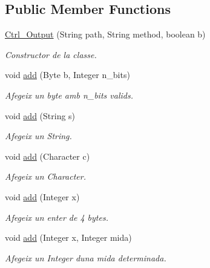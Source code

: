 \subsection*{Public Member Functions}
\begin{DoxyCompactItemize}
\item 
\hyperlink{classpersistencia_1_1output_1_1Ctrl__Output_afeb28ec6172b522bf6bdaf16238d622b}{Ctrl\+\_\+\+Output} (String path, String method, boolean b)
\begin{DoxyCompactList}\small\item\em Constructor de la classe. \end{DoxyCompactList}\item 
void \hyperlink{classpersistencia_1_1output_1_1Ctrl__Output_a8c5aa5a6acb5259faeb1c05c71ddd21c}{add} (Byte b, Integer n\+\_\+bits)
\begin{DoxyCompactList}\small\item\em Afegeix un byte amb n\+\_\+bits valids. \end{DoxyCompactList}\item 
void \hyperlink{classpersistencia_1_1output_1_1Ctrl__Output_a0e3bedb0b88d0e60b228cc49143e6f0e}{add} (String s)
\begin{DoxyCompactList}\small\item\em Afegeix un String. \end{DoxyCompactList}\item 
void \hyperlink{classpersistencia_1_1output_1_1Ctrl__Output_a4070b40016edf1d959b3f7c60c90ef10}{add} (Character c)
\begin{DoxyCompactList}\small\item\em Afegeix un Character. \end{DoxyCompactList}\item 
void \hyperlink{classpersistencia_1_1output_1_1Ctrl__Output_aefe249b0ae9dbe578c44d96c6b56cf5d}{add} (Integer x)
\begin{DoxyCompactList}\small\item\em Afegeix un enter de 4 bytes. \end{DoxyCompactList}\item 
void \hyperlink{classpersistencia_1_1output_1_1Ctrl__Output_ac792cc55e30c9c769e10a20c2dd41bc8}{add} (Integer x, Integer mida)
\begin{DoxyCompactList}\small\item\em Afegeix un Integer d\textquotesingle{}una mida determinada. \end{DoxyCompactList}\item 

\end{DoxyCompactItemize}
